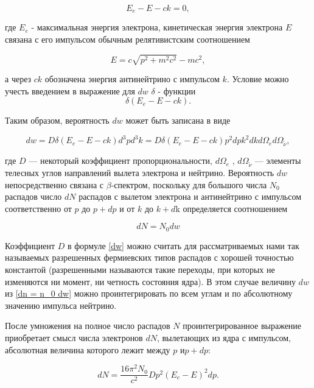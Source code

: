 \documentclass[a4paper,12pt]{report}
\begin{document}
\begin{equation}
E_e - E - ck = 0,
\end{equation}

где $E_e$ - максимальная энергия электрона, кинетическая энергия электрона $ E $ связана с его импульсом обычным релятивистским соотношением

\begin{equation}
E = c\sqrt{p^2 + m^2c^2} - mc^2,
\end{equation}

а через $ ck $ обозначена энергия антинейтрино с импульсом $ k $. Условие можно учесть введением в выражение для $ dw $ $\delta$ - функции
\begin{equation}
\delta (E_e - E - ck).
\end{equation}

Таким образом, вероятность $ dw $ может быть записана в виде

\begin{equation}\label{dw}
dw = D \delta (E_e - E - ck)d^3 p d^3 k = D \delta (E_e - E - ck)p^2dpk^2dkd{\Omega}_ed{\Omega}_{\widetilde{\nu}},
\end{equation}

где $ D $ --- некоторый коэффициент пропорциональности, $d\Omega_e$ , $d\Omega_{\widetilde{\nu}}$ --- элементы телесных углов направлений вылета электрона и нейтрино. Вероятность $ dw $ непосредственно связана с $\beta$-спектром, поскольку для большого числа $N_0$ распадов число $dN$ распадов с вылетом электрона и антинейтрино с импульсом соответственно от $ p $ до $ p + dp $ и от
$ k $ до $ k + d $k определяется соотношением

\begin{equation}\label{dn = n_0 dw}
dN = N_0 dw  
\end{equation}

Коэффициент $ D $ в формуле \eqref{dw} можно считать для рассматриваемых нами так называемых разрешенных фермиевских типов распадов с хорошей точностью константой (разрешенными называются такие переходы, при которых не изменяются ни момент, ни четность состояния ядра). В этом случае величину $ dw $ из \eqref{dn = n_0 dw} можно проинтегрировать по всем углам и по абсолютному значению импульса нейтрино.

После умножения на полное число распадов $ N $ проинтегрированное выражение приобретает смысл числа электронов $ dN $, вылетающих из ядра с импульсом, абсолютная величина которого лежит между $ p $ и$  p + dp $:

\begin{equation}\label{dN}
dN = \dfrac{16\pi^2 N_0}{c^2}Dp^2(E_e - E)^2dp.
\end{equation}
\end{document}
